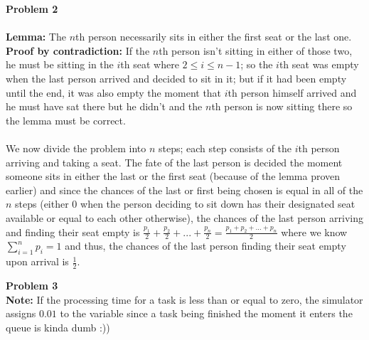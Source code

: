 \documentclass{article}
\newenvironment{problem}[2][Problem]
    { \begin{mdframed}[backgroundcolor=gray!20] \textbf{#1 #2} \\}
    {  \end{mdframed}}
\begin{document}
    \begin{problem}{2}
    	\\
    	\textbf{Lemma:} The $n$th person necessarily sits in either the first seat or the
    	last one. \\ \textbf{Proof by contradiction:} If the $n$th person isn't sitting in 
    	either of those two, he must be sitting in the $i$th seat where $2\leq i\leq n-1$;
    	so the $i$th seat was empty when the last person arrived and decided to sit in it;
    	but if it had been empty until the end, it was also empty the moment that $i$th person
    	himself arrived and he must have sat there but he didn't and the $n$th person is now
    	sitting there so the lemma must be correct. \\ \\
    	We now divide the problem into $n$ steps; each step consists of the $i$th person arriving 
    	and taking a seat. The fate of the last person is decided the moment someone sits
    	in either the last or the first seat (because of the lemma proven earlier) and since 
    	the chances of the last or first being chosen is equal in all of the $n$ 
    	steps (either $0$ when the person deciding to sit down has their designated seat available
    	or equal to each other otherwise), the chances of the last person arriving and finding 
    	their seat empty is $\displaystyle\frac{p_1}{2}+\frac{p_2}{2}+...+\frac{p_n}{2} = \frac{p_1+p_2+...+p_n}{2}$   where we know $\displaystyle\sum_{i=1}^{n}p_i=1$ and thus, the chances of the last person
    	finding their seat empty upon arrival is $\displaystyle\frac{1}{2}$.
    \end{problem}
    
    \begin{problem}{3}
    	\textbf{Note:} If the processing time for a task is less than or equal to zero, 
    	the simulator assigns $0.01$ to the variable since a task being finished the moment 
    	it enters the queue is kinda dumb :))
    \end{problem}
    
\end{document}
